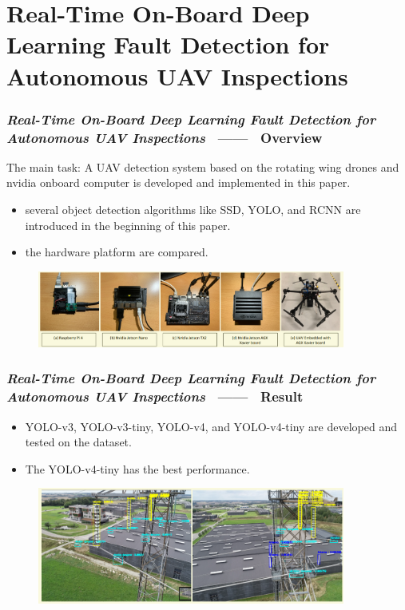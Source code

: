 \section{Real-Time On-Board Deep Learning Fault Detection for Autonomous UAV
Inspections}

\begin{frame}
    \frametitle{\textit{Real-Time On-Board Deep Learning Fault Detection for
    Autonomous UAV Inspections} ~------~ Overview}

    \begin{block}{The main task:}
        A UAV detection system based on the rotating wing drones and nvidia onboard
        computer is developed and implemented in this paper.
    \end{block}

    \begin{itemize}
        \item several object detection algorithms like SSD, YOLO, and RCNN are
            introduced in the beginning of this paper.
        \item the hardware platform are compared.
    \end{itemize}

    \begin{figure}[H]
        \centering
        \includegraphics[width=0.9\textwidth]{./imgs/hardwares.png}
    \end{figure}

\end{frame}

\begin{frame}
    \frametitle{\textit{Real-Time On-Board Deep Learning Fault Detection for
    Autonomous UAV Inspections} ~------~ Result}

    \begin{itemize}
        \item YOLO-v3, YOLO-v3-tiny, YOLO-v4, and YOLO-v4-tiny are developed and
            tested on the dataset.
        \item The YOLO-v4-tiny has the best performance.
    \end{itemize}

    \begin{figure}[H]
        \centering
        \includegraphics[width=0.9\textwidth]{./imgs/yolo_result.png}
    \end{figure}

\end{frame}
